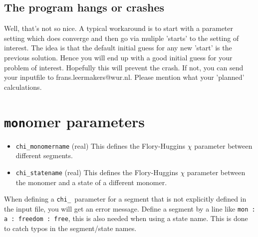 \documentclass{article}
\begin{document}
\subsection{The program hangs or crashes}

Well, that's not so nice. A typical workaround is to start with a parameter setting which does converge and then go via muliple 'starts' to the setting of interest. The idea is that the default initial guess for any new 'start' is the previous solution. Hence you will end up with a good initial guess for your problem of interest. Hopefully this will prevent the crash. If not, you can send your inputfile to frans.leermakers@wur.nl. Please mention what your 'planned' calculations.

\section{{\tt mon}omer parameters}
\label{sec:monomer}

\begin{itemize}

\item{\tt chi\_monomername} (real) This defines the Flory-Huggins $\chi$ parameter between different segments.

\item{\tt chi\_statename} (real) This defines the Flory-Huggins $\chi$ parameter between the monomer and a state of a different 
monomer.


\end{itemize}
When defining a \texttt{chi\_ }parameter for a segment that is not explicitly defined in the input file, you will get an error message. Define a segment by a line like \texttt{mon : a : freedom : free},  this is also needed when using a state name.  This is done to catch typos in the segment/state names.
\end{document}
